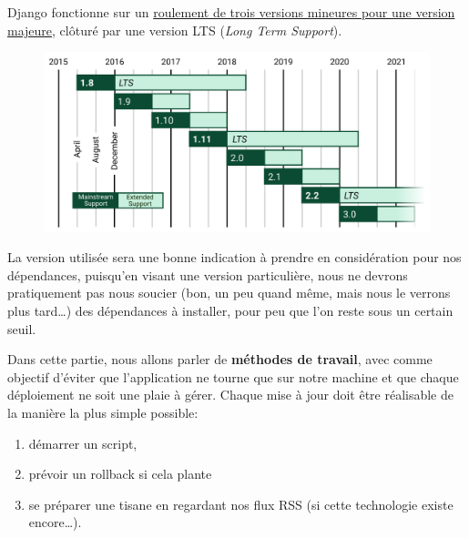 \documentclass[11pt]{amsbook}
\begin{document}
Django fonctionne sur un \href{https://docs.djangoproject.com/en/dev/internals/release-process/}{roulement de trois versions mineures pour une version majeure}, clôturé par une version LTS (\emph{Long Term Support}).


\begin{figure}[h]{}
\centering\includegraphics[width=2.5truein]{images/django-support-lts.png}


\end{figure}

La version utilisée sera une bonne indication à prendre en considération pour nos dépendances, puisqu’en visant une version particulière, nous ne devrons pratiquement pas nous soucier (bon, un peu quand même, mais nous le verrons plus tard…​) des dépendances à installer, pour peu que l’on reste sous un certain seuil.


Dans cette partie, nous allons parler de \textbf{méthodes de travail}, avec comme objectif d’éviter que l’application ne tourne que sur notre machine et que chaque déploiement ne soit une plaie à gérer.
Chaque mise à jour doit être réalisable de la manière la plus simple possible:


\begin{enumerate}

\item{démarrer un script,}

\item{prévoir un rollback si cela plante}

\item{se préparer une tisane en regardant nos flux RSS (si cette technologie existe encore…​).}

\end{enumerate}
\end{document}
